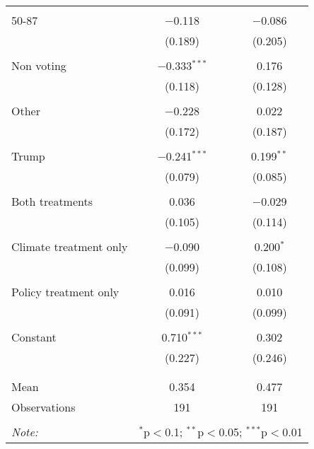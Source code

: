 \begin{tabular}{@{\extracolsep{5pt}}lcc}
  & & \\ 
 50-87 & $-$0.118 & $-$0.086 \\ 
  & (0.189) & (0.205) \\ 
  & & \\ 
 Non voting & $-$0.333$^{***}$ & 0.176 \\ 
  & (0.118) & (0.128) \\ 
  & & \\ 
 Other & $-$0.228 & 0.022 \\ 
  & (0.172) & (0.187) \\ 
  & & \\ 
 Trump & $-$0.241$^{***}$ & 0.199$^{**}$ \\ 
  & (0.079) & (0.085) \\ 
  & & \\ 
 Both treatments & 0.036 & $-$0.029 \\ 
  & (0.105) & (0.114) \\ 
  & & \\ 
 Climate treatment only & $-$0.090 & 0.200$^{*}$ \\ 
  & (0.099) & (0.108) \\ 
  & & \\ 
 Policy treatment only & 0.016 & 0.010 \\ 
  & (0.091) & (0.099) \\ 
  & & \\ 
 Constant & 0.710$^{***}$ & 0.302 \\ 
  & (0.227) & (0.246) \\ 
  & & \\ 
\hline \\[-1.8ex] 
Mean & 0.354 & 0.477 \\ 
Observations & 191 & 191 \\ 
\hline 
\hline \\[-1.8ex] 
\textit{Note:}  & \multicolumn{2}{r}{$^{*}$p$<$0.1; $^{**}$p$<$0.05; $^{***}$p$<$0.01} \\ 
\end{tabular} 
